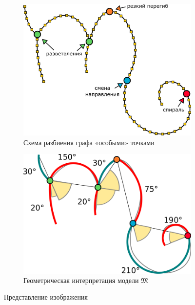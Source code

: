 \begin{figure}[h]

\centering
	\begin{subfigure}[centerlast,FIGBOTCAP]{.45\textwidth}
		\centering
		\includegraphics[width=\textwidth,keepaspectratio]{images/graph}
		\medskip
		\caption{Схема разбиения графа «особыми» точками}
		\label{fig:special}
	\end{subfigure}
	\hfill
	\begin{subfigure}[centerlast,FIGBOTCAP]{.45\textwidth}
		\centering
		\includegraphics[width=\textwidth,keepaspectratio]{images/items}
		\medskip
		\caption{Геометрическая интерпретация модели $\mathfrak{M}$}
		\label{fig:geometry}
	\end{subfigure}
	\caption{Представление изображения}
\end{figure}

